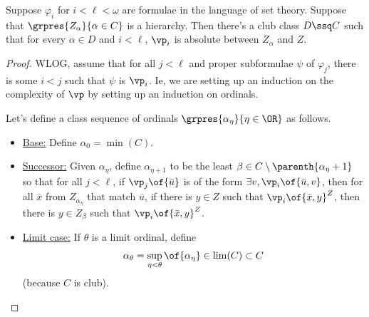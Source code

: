 \begin{boxtheorem} \label{Ch3:Thm:Reflection}
    Suppose $\varphi_i$ for $i < \ell < \omega$ are formulae in the language of set theory. Suppose that $\grpres{Z_{\alpha}}{\alpha \in C}$ is a hierarchy. Then there's a club class $D \ssq C$ such that for every $\alpha \in D$ and $i < \ell$, $\vp_i$ is absolute between $Z_{\alpha}$ and $Z$.
\end{boxtheorem}
\begin{proof}
    WLOG, assume that for all $j < \ell$ and proper subformulae $\psi$ of $\varphi_j$, there is some $i < j$ such that $\psi$ is $\vp_{i}$. Ie, we are setting up an induction on the complexity of $\vp$ by setting up an induction on ordinals.

    Let's define a class sequence of ordinals $\grpres{\alpha_{\eta}}{\eta \in \OR}$ as follows.
    \begin{itemize}
        \item \underline{Base:} Define $\alpha_0 = \min(C)$.
        \item \underline{Successor:} Given $\alpha_{\eta}$, define $\alpha_{\eta + 1}$ to be the least $\beta \in C \setminus \parenth{\alpha_{\eta} + 1}$ so that for all $j < \ell$, if $\vp_{j}\of{\bar{u}}$ is of the form $\exists v, \vp_i\of{\bar{u}, v}$, then for all $\bar{x}$ from $Z_{\alpha_{\eta}}$ that match $\bar{u}$, if there is $y \in Z$ such that $\vp_i\of{\bar{x}, y}^Z$, then there is $y \in Z_{\beta}$ such that $\vp_i\of{\bar{x}, y}^Z$.
        \item \underline{Limit case:} If $\theta$ is a limit ordinal, define
        \begin{align*}
            \alpha_{\theta} = \sup_{\eta < \theta} \of{\alpha_{\eta}} \in \lim(C) \subset C
        \end{align*}
        (because $C$ is club).
    \end{itemize}


\end{proof}
